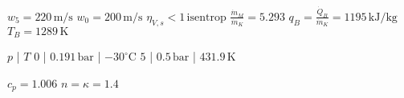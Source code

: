 \( w_5 = 220 \, \text{m/s} \)  
\( w_0 = 200 \, \text{m/s} \)  
\( \eta_{V,s} < 1 \, \text{isentrop} \)  
\( \frac{\dot{m}_M}{\dot{m}_K} = 5.293 \)  
\( q_B = \frac{\dot{Q}_B}{\dot{m}_K} = 1195 \, \text{kJ/kg} \)  
\( T_B = 1289 \, \text{K} \)  

\( p \) | \( T \)  
\( 0 \) | \( 0.191 \, \text{bar} \) | \( -30^\circ \text{C} \)  
\( 5 \) | \( 0.5 \, \text{bar} \) | \( 431.9 \, \text{K} \)  

\( c_p = 1.006 \)  
\( n = \kappa = 1.4 \)